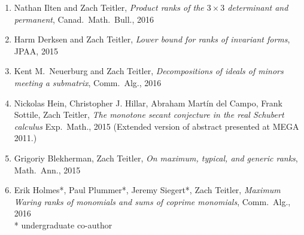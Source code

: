 \documentclass[12pt]{article}
\begin{document}
\begin{enumerate}[revarabic,labelwidth=*]
\item Nathan Ilten and Zach Teitler,
\emph{Product ranks of the $3 \times 3$ determinant and permanent},
Canad.\ Math.\ Bull.,
2016

\item Harm Derksen and Zach Teitler,
\emph{Lower bound for ranks of invariant forms},
JPAA,
2015

\item Kent M.\ Neuerburg and Zach Teitler,
\emph{Decompositions of ideals of minors meeting a submatrix},
Comm.\ Alg.,
2016


\item Nickolas Hein, Christopher J. Hillar, Abraham Mart\'in del Campo, Frank Sottile, Zach Teitler,
\emph{The monotone secant conjecture in the real Schubert calculus}
Exp.\ Math.,
2015
(Extended version of abstract presented at MEGA 2011.)

\item Grigoriy Blekherman, Zach Teitler,
\emph{On maximum, typical, and generic ranks},
Math.\ Ann.,
2015

\item Erik Holmes*, Paul Plummer*, Jeremy Siegert*, Zach Teitler,
\emph{Maximum Waring ranks of monomials and sums of coprime monomials},
Comm.\ Alg.,
2016\\
* undergraduate co-author


\end{enumerate}
\end{document}
